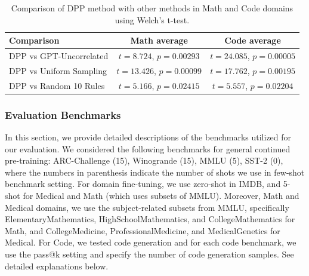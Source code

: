 \documentclass{article}
\begin{document}
\begin{table}[ht]
\centering
\small
\begin{tabular}{@{}lcc@{}}
\toprule
Comparison & Math average & Code average \\ \midrule
DPP vs GPT-Uncorrelated & \(t=8.724\), \(p=0.00293\) & \(t=24.085\), \(p=0.00005\) \\
DPP vs Uniform Sampling & \(t=13.426\), \(p=0.00099\) & \(t=17.762\), \(p=0.00195\) \\
DPP vs Random 10 Rules  & \(t=5.166\), \(p=0.02415\) & \(t=5.557\), \(p=0.02204\) \\
\bottomrule
\end{tabular}
\caption{Comparison of DPP method with other methods in Math and Code domains using Welch's t-test.}
\label{tab:method_comparison_math_code}
\end{table}




\subsubsection{Evaluation Benchmarks}
\label{appendix:benchmark}
In this section, we provide detailed descriptions of the benchmarks utilized for our evaluation. We considered the following benchmarks for general continued pre-training: ARC-Challenge (15), Winogrande (15), MMLU (5), SST-2 (0), where the numbers in parenthesis indicate the number of shots we use in few-shot benchmark setting. For domain fine-tuning, we use zero-shot in IMDB, and 5-shot for Medical and Math (which uses subsets of MMLU). Moreover, Math and Medical domains, we use the subject-related subsets from MMLU, specifically ElementaryMathematics, HighSchoolMathematics, and CollegeMathematics for Math, and CollegeMedicine, ProfessionalMedicine, and MedicalGenetics for Medical. For Code, we tested code generation and for each code benchmark, we use the pass@k setting and specify the number of code generation samples. See detailed explanations below.
\end{document}
